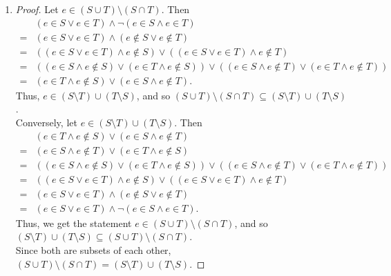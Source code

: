 \documentclass{homework}
\begin{document}
\begin{solution}
\begin{enumerate}[label=(\alph*)]
  \item 
    \begin{proof}[Proof]
      Let $e\in \left( S\cup T \right) \setminus \left( S\cap T \right) $. Then
      \begin{align*}
        &\left( e\in S\lor e\in T \right) \land \neg \left( e\in S\land e\in T \right) \\
        =&\left( e\in S\lor e\in T \right) \land \left( e\not\in S\lor e\not\in T \right) \\
        =&\left( \left( e\in S\lor e\in T \right) \land e\not\in S \right) \lor \left( 
        \left( e\in S\lor e\in T \right)\land e\not\in T\right) \\
        =&\left( \left( e\in S\land e\not\in S \right) \lor \left( e\in T\land e\not\in S \right)
        \right) \lor \left( \left(  e\in S\land e\not\in T \right) \lor \left( e\in T\land e\not\in
      T\right) \right) \\
        =&\left( e\in T\land e\not\in S \right) \lor \left( e\in S\land e\not\in T \right) 
      .\end{align*}
      Thus, $e\in \left( S\setminus T \right) \cup \left( T\setminus S \right) $, and so $\left( S\cup T \right)
      \setminus \left( S\cap T \right) \subseteq \left( S\setminus T \right) \cup \left( T\setminus S \right) $.\\
      Conversely, let $e\in \left( S\setminus T \right) \cup \left( T\setminus S \right) $. Then
      \begin{align*}
        &\left( e\in T\land e\not\in S \right) \lor \left( e\in S\land e\not\in T \right) \\
        =&\left( e\in S\land e\not\in T \right) \lor \left( e\in T\land e\not\in S \right) \\
        =&\left( \left( e\in S\land e\not\in S \right) \lor \left( e\in T\land e\not\in S \right)
        \right) \lor \left( \left(  e\in S\land e\not\in T \right) \lor \left( e\in T\land e\not\in
      T\right) \right) \\
        =&\left( \left( e\in S\lor e\in T \right) \land e\not\in S \right) \lor \left( 
        \left( e\in S\lor e\in T \right)\land e\not\in T\right) \\
        =&\left( e\in S\lor e\in T \right) \land \left( e\not\in S\lor e\not\in T \right) \\
        =&\left( e\in S\lor e\in T \right) \land \neg \left( e\in S\land e\in T \right)
      .\end{align*}
      Thus, we get the statement 
      $e\in \left( S\cup T \right) \setminus \left( S\cap T\right) $, and so $\left( S\setminus 
      T \right) \cup \left( T\setminus S \right) \subseteq \left( S\cup T \right) \setminus \left(
    S\cap T \right) $.\\
      Since both are subsets of each other, $\left( S\cup T \right) \setminus \left( S\cap T \right)
      = \left( S\setminus T \right) \cup \left( T\setminus S \right)$.
    \end{proof}
\end{enumerate}


\end{solution}
\end{document}
